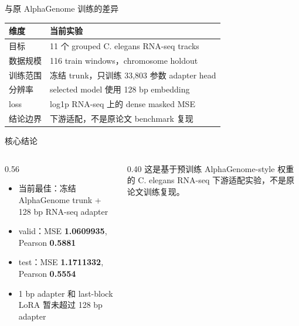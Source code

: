 \documentclass[UTF8,aspectratio=169,10pt]{ctexbeamer}
\begin{document}
\begin{frame}{与原 AlphaGenome 训练的差异}
  \begin{tabular}{p{}p{}}
    \toprule
    维度 & 当前实验 \\
    \midrule
    目标 & 11 个 grouped C. elegans RNA-seq tracks \\
    数据规模 & 116 train windows，chromosome holdout \\
    训练范围 & 冻结 trunk，只训练 33,803 参数 adapter head \\
    分辨率 & selected model 使用 128 bp embedding \\
    loss & log1p RNA-seq 上的 dense masked MSE \\
    结论边界 & 下游适配，不是原论文 benchmark 复现 \\
    \bottomrule
  \end{tabular}
\end{frame}

\begin{frame}{核心结论}
  \begin{columns}[T,onlytextwidth]
    \begin{column}{0.56\textwidth}
      \begin{itemize}
        \item 当前最佳：冻结 AlphaGenome trunk + 128 bp RNA-seq adapter
        \item valid：MSE \textbf{1.0609935}, Pearson \textbf{0.5881}
        \item test：MSE \textbf{1.1711332}, Pearson \textbf{0.5554}
        \item 1 bp adapter 和 last-block LoRA 暂未超过 128 bp adapter
      \end{itemize}
    \end{column}
    \begin{column}{0.40\textwidth}
      \footnotesize
      这是基于预训练 AlphaGenome-style 权重的 C. elegans RNA-seq 下游适配实验，不是原论文训练复现。
    \end{column}
  \end{columns}
\end{frame}
\end{document}
